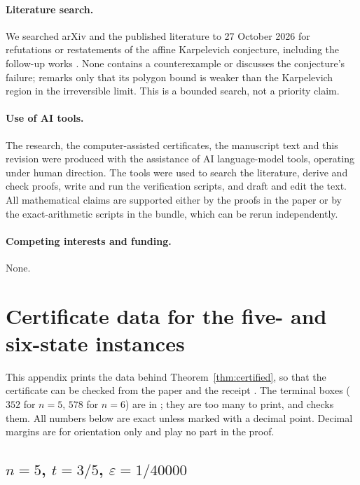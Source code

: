 \documentclass[11pt,a4paper]{article}
\numberwithin{equation}{section}
\theoremstyle{definition}
\theoremstyle{remark}
\newcommand{\eps}{\varepsilon}
\begin{document}
\paragraph{Literature search.} We searched arXiv and the published
literature to 27 October 2026 for refutations or restatements of the
affine Karpelevich conjecture, including the follow-up works
\cite{kolchinsky2026,xu2026,verbeken2026,chruscinski2025}. None
contains a counterexample or discusses the conjecture's failure;
\cite{kolchinsky2026} remarks only that its polygon bound is weaker than
the Karpelevich region in the irreversible limit. This is a bounded
search, not a priority claim.

\paragraph{Use of AI tools.} The research, the computer-assisted
certificates, the manuscript text and this revision were produced with
the assistance of AI language-model tools, operating under human
direction. The tools were used to search the literature, derive and
check proofs, write and run the verification scripts, and draft and
edit the text. All mathematical claims are supported either by the
proofs in the paper or by the exact-arithmetic scripts in the bundle,
which can be rerun independently.

\paragraph{Competing interests and funding.} None.

\appendix
\section{Certificate data for the five- and six-state instances}
\label{app:certificates}

This appendix prints the data behind Theorem~\ref{thm:certified}, so that
the certificate can be checked from the paper and the receipt
. The terminal boxes
(\(352\) for \(n=5\), \(578\) for \(n=6\)) are in
; they are too many to print,
and  checks them. All numbers below
are exact unless marked with a decimal point. Decimal margins are for
orientation only and play no part in the proof.

\subsection{\texorpdfstring{\(n=5\), \(t=3/5\), \(\eps=1/40000\)}{n=5}}
\end{document}
